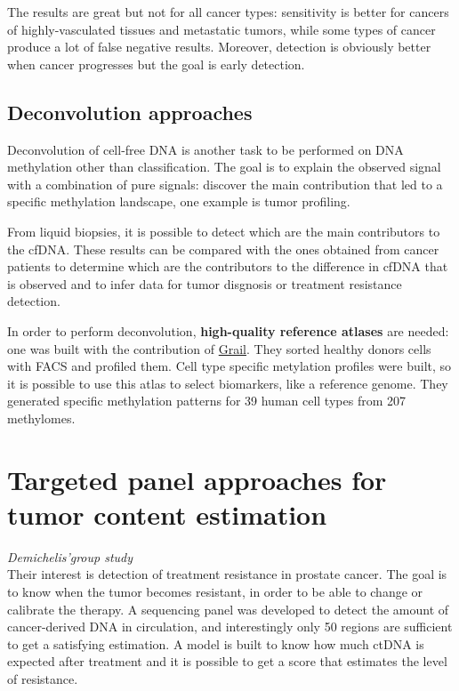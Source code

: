 The results are great but not for all cancer types: sensitivity is better for
cancers of highly-vasculated tissues and metastatic tumors, while some types of
cancer produce a lot of false negative results. Moreover, detection is obviously
better when cancer progresses but the goal is early detection.


\subsection{Deconvolution approaches}

Deconvolution of cell-free DNA is another task to be performed on DNA
methylation other than classification. The goal is to explain the observed
signal with a combination of pure signals: discover the main contribution that
led to a specific methylation landscape, one example is tumor profiling.

From liquid biopsies, it is possible to detect which are the main contributors
to the cfDNA. These results can be compared with the ones obtained from cancer
patients to determine which are the contributors to the difference in cfDNA that
is observed and to infer data for tumor disgnosis or treatment resistance
detection.

In order to perform deconvolution, \textbf{high-quality reference atlases} are
needed: one was built with the contribution of
\href{https://www.biorxiv.org/content/10.1101/2022.01.24.477547v1}{Grail}. They
sorted healthy donors cells with FACS and profiled them. Cell type specific
metylation profiles were built, so it is possible to use this atlas to select
biomarkers, like a reference genome. They generated specific methylation
patterns for 39 human cell types from 207 methylomes.

\section{Targeted panel approaches for tumor content estimation}
\textit{Demichelis'group study}\\

Their interest is detection of treatment resistance in prostate cancer. The goal
is to know when the tumor becomes resistant, in order to be able to change or
calibrate the therapy. A sequencing panel was developed to detect the amount of
cancer-derived DNA in circulation, and interestingly only 50 regions are
sufficient to get a satisfying estimation. A model is built to know how much
ctDNA is expected after treatment and it is possible to get a score that
estimates the level of resistance.
